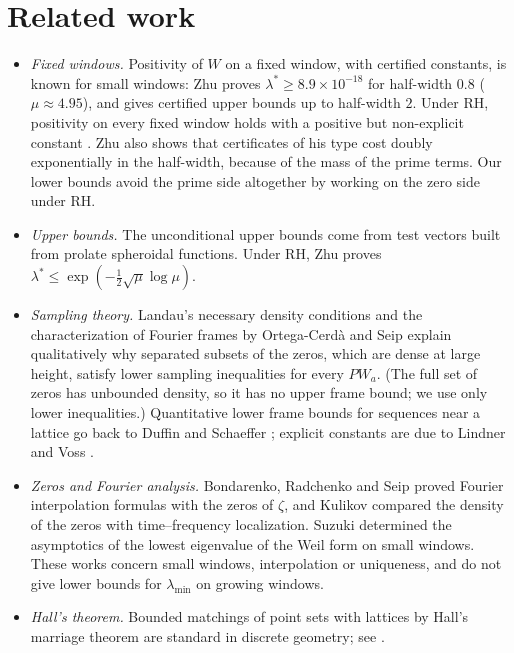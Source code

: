 \documentclass[11pt]{amsart}
\theoremstyle{definition}
\theoremstyle{remark}
\numberwithin{equation}{section}
\begin{document}
\section{Related work}\label{sec:related}
\begin{itemize}
\item \emph{Fixed windows.} Positivity of $W$ on a fixed window, with certified constants, is known for small windows: Zhu \cite{Zhu26} proves $\lambda^*\ge8.9\times10^{-18}$ for half-width $0.8$ ($\mu\approx4.95$), and gives certified upper bounds up to half-width $2$. Under RH, positivity on every fixed window holds with a positive but non-explicit constant \cite[Prop.~2.3]{Zhu26}. Zhu also shows that certificates of his type cost doubly exponentially in the half-width, because of the mass of the prime terms. Our lower bounds avoid the prime side altogether by working on the zero side under RH.
\item \emph{Upper bounds.} The unconditional upper bounds \cite{MoriWWUB,MoriWeilII,MoriWeilIII} come from test vectors built from prolate spheroidal functions. Under RH, Zhu proves $\lambda^*\le\exp(-\frac12\sqrt\mu\log\mu)$.
\item \emph{Sampling theory.} Landau's necessary density conditions \cite{Landau67} and the characterization of Fourier frames by Ortega-Cerd\`a and Seip \cite{OCS02} explain qualitatively why separated subsets of the zeros, which are dense at large height, satisfy lower sampling inequalities for every $PW_a$. (The full set of zeros has unbounded density, so it has no upper frame bound; we use only lower inequalities.) Quantitative lower frame bounds for sequences near a lattice go back to Duffin and Schaeffer \cite{DS52}; explicit constants are due to Lindner \cite{Lindner99} and Voss \cite{Voss99}.
\item \emph{Zeros and Fourier analysis.} Bondarenko, Radchenko and Seip \cite{BRS23} proved Fourier interpolation formulas with the zeros of $\zeta$, and Kulikov \cite{Kulikov21} compared the density of the zeros with time--frequency localization. Suzuki \cite{Suzuki26} determined the asymptotics of the lowest eigenvalue of the Weil form on small windows. These works concern small windows, interpolation or uniqueness, and do not give lower bounds for $\lambda_{\min}$ on growing windows.
\item \emph{Hall's theorem.} Bounded matchings of point sets with lattices by Hall's marriage theorem are standard in discrete geometry; see \cite{KS21}.
\end{itemize}
\end{document}
